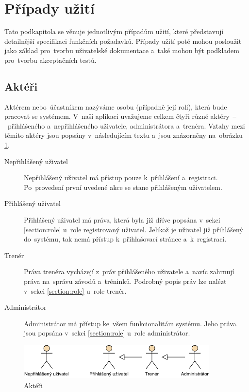\section{Případy užití}
Tato podkapitola se věnuje jednotlivým případům užití, které představují detailnější specifikaci funkčních požadavků. Případy užití poté mohou posloužit jako základ pro~tvorbu uživatelské dokumentace a~také mohou být podkladem pro~tvorbu akceptačních testů. \cite{usecases}

\subsection{Aktéři}
Aktérem nebo~účastníkem nazýváme osobu (případně její roli), která bude pracovat se systémem. V~naší aplikaci uvažujeme celkem čtyři různé aktéry~–~přihlášeného a~nepřihlášeného uživatele, administrátora a~trenéra. Vztahy mezi těmito aktéry jsou popsány v~následujícím textu a~jsou znázorněny na~obrázku \ref{figure:actors}.

\begin{description}
	\item[Nepřihlášený uživatel]\hfill\newline
	Nepřihlášený uživatel má přístup pouze k~přihlášení a~registraci. Po~provedení první uvedené akce se stane přihlášeným uživatelem.
	\item[Přihlášený uživatel]\hfill\newline
	Přihlášený uživatel má práva, která byla již dříve popsána v~sekci \ref{section:role} u~role registrovaný uživatel. Jelikož je uživatel již přihlášený do~systému, tak nemá přístup k~přihlašovací stránce a~k~registraci.
	\item[Trenér]\hfill\newline
	Práva trenéra vycházejí z~práv přihlášeného uživatele a~navíc zahrnují práva na~správu závodů a~tréninků. Podrobný popis práv lze nalézt v~sekci \ref{section:role} u~role trenér.
	\item[Administrátor]\hfill\newline
	Administrátor má přístup ke~všem funkcionalitám systému. Jeho práva jsou popsána v~sekci \ref{section:role} u~role administrátor.
\end{description}

\begin{figure}[h]
	\caption{Aktéři}
	\label{figure:actors}
	\centering
	\includegraphics[width=0.9\textwidth]{images/actors.pdf}
\end{figure}

